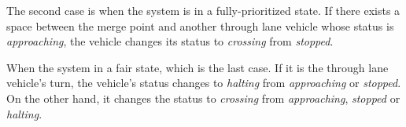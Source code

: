 \documentclass[10pt, conference, compsocconf]{IEEEtran}
\begin{document}
The second case is when the system is in a fully-prioritized state.
If there exists a space between the merge point and another through lane vehicle whose status is \textit{approaching}, 
the vehicle changes its status to \textit{crossing} from \textit{stopped}.

When the system in a fair state, which is the last case.
If it is the through lane vehicle's turn, the vehicle's status changes to \textit{halting} from \textit{approaching} or \textit{stopped}. 
On the other hand, it changes the status to \textit{crossing} from \textit{approaching}, \textit{stopped} or \textit{halting}. 
 


 
\end{document}
